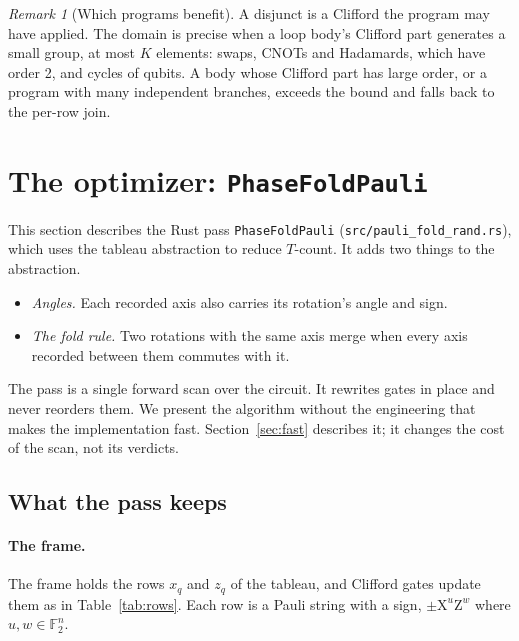 \documentclass[11pt]{article}
\theoremstyle{definition}
\theoremstyle{remark}
\newtheorem{remark}[theorem]{Remark}
\newcommand{\tX}{\mathrm{X}}
\newcommand{\tZ}{\mathrm{Z}}
\begin{document}
\begin{remark}[Which programs benefit]
A disjunct is a Clifford the program may have applied. The domain is precise when a loop
body's Clifford part generates a small group, at most $K$ elements: swaps, CNOTs and
Hadamards, which have order 2, and cycles of qubits. A body whose Clifford part has large
order, or a program with many independent branches, exceeds the bound and falls back to
the per-row join.
\end{remark}

\section{The optimizer: \texttt{PhaseFoldPauli}}\label{sec:rust}

This section describes the Rust pass \texttt{PhaseFoldPauli}
(\texttt{src/pauli\_fold\_rand.rs}), which uses the tableau abstraction to reduce
$T$-count. It adds two things to the abstraction.
\begin{itemize}[nosep]
  \item \emph{Angles.} Each recorded axis also carries its rotation's angle and sign.
  \item \emph{The fold rule.} Two rotations with the same axis merge when every axis
  recorded between them commutes with it.
\end{itemize}
The pass is a single forward scan over the circuit. It rewrites gates in place and never
reorders them. We present the algorithm without the engineering that makes the
implementation fast. Section~\ref{sec:fast} describes it; it changes the cost of the scan,
not its verdicts.

\subsection{What the pass keeps}

\paragraph{The frame.}
The frame holds the rows $x_q$ and $z_q$ of the tableau, and Clifford gates update them as
in Table~\ref{tab:rows}. Each row is a Pauli string with a sign, $\pm\tX^{u}\tZ^{w}$ where
$u, w \in \mathbb{F}_2^n$.
\end{document}
